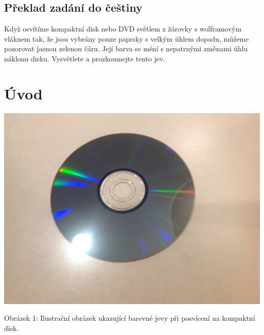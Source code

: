 \documentclass[titlepage]{article}
\begin{document}
\subsection{Překlad zadání do češtiny}

Když osvítíme kompaktní disk nebo DVD světlem z žárovky s wolframovým vláknem tak, že jsou vybrány pouze paprsky s velkým úhlem dopadu, můžeme pozorovat jasnou zelenou čáru. Její barva se mění s nepatrnými změnami úhlu náklonu disku. Vysvětlete a prozkoumejte tento jev.

\section{Úvod}

 \label{image:1}
\includegraphics[width=\textwidth]{illustration1.png}
\begin{center}
    Obrázek 1: Ilustrační obrázek ukazující barevné jevy při posvícení na kompaktní disk. \cite{img1}
\end{center}
\end{document}
